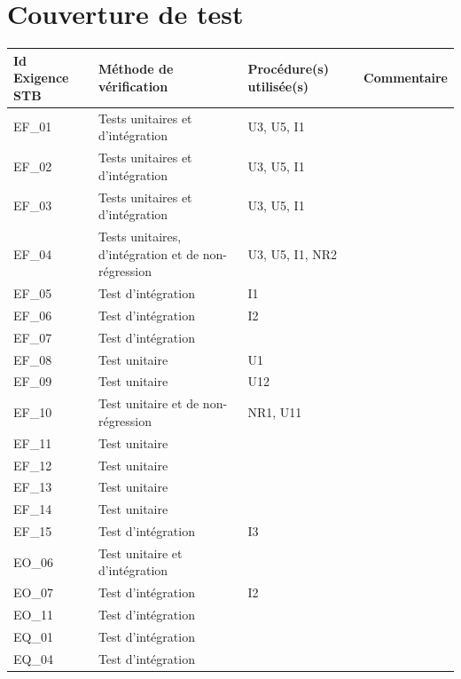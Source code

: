 \documentclass{../res/univ-projet}
\begin{document}
\section{Couverture de test}

\begin{center}
    \begin{tabular}{|p{2.8cm}|p{4.2cm}|p{3cm}|p{5cm}|}
      \hline
      Id Exigence STB & Méthode de vérification & Procédure(s) utilisée(s) & Commentaire\\ \hline
      EF\_01 & Tests unitaires et d'intégration & U3, U5, I1 & \\ \hline
      EF\_02 & Tests unitaires et d'intégration & U3, U5, I1 & \\ \hline
      EF\_03 & Tests unitaires et d'intégration & U3, U5, I1 & \\ \hline
      EF\_04 & Tests unitaires, d'intégration et de non-régression & U3, U5, I1, NR2 & \\ \hline
      EF\_05 & Test d'intégration & I1 & \\ \hline
      EF\_06 & Test d'intégration & I2 & \\ \hline
      EF\_07 & Test d'intégration &  & \\ \hline
      EF\_08 & Test unitaire & U1 & \\ \hline
      EF\_09 & Test unitaire & U12 & \\ \hline
      EF\_10 & Test unitaire et de non-régression & NR1, U11 & \\ \hline
      EF\_11 & Test unitaire &  & \\ \hline
      EF\_12 & Test unitaire &  & \\ \hline
      EF\_13 & Test unitaire &  & \\ \hline
      EF\_14 & Test unitaire &  & \\ \hline
      EF\_15 & Test d'intégration & I3 & \\ \hline
      EO\_06 & Test unitaire et d'intégration &  & \\ \hline
      EO\_07 & Test d'intégration & I2 & \\ \hline
      EO\_11 & Test d'intégration &  & \\ \hline
      EQ\_01 & Test d'intégration &  & \\ \hline
      EQ\_04 & Test d'intégration &  & \\ \hline
  \end{tabular}  
\end{center}
\end{document}
